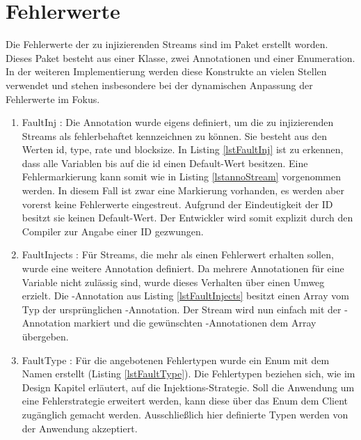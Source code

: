 \section{Fehlerwerte}
Die Fehlerwerte der zu injizierenden Streams sind im Paket  erstellt worden. Dieses Paket besteht aus einer Klasse, zwei Annotationen und einer Enumeration. In der weiteren Implementierung werden diese Konstrukte an vielen Stellen verwendet und stehen insbesondere bei der dynamischen Anpassung der Fehlerwerte im Fokus.

\begin{enumerate}
	\item FaultInj : Die Annotation  wurde eigens definiert, um die zu injizierenden Streams als fehlerbehaftet kennzeichnen zu können. Sie besteht aus den Werten id, type, rate und blocksize. In Listing \ref{lstFaultInj} ist zu erkennen, dass alle Variablen bis auf die id einen Default-Wert besitzen. Eine Fehlermarkierung kann somit wie in Listing \ref{lstannoStream} vorgenommen werden. In diesem Fall ist zwar eine Markierung vorhanden, es werden aber vorerst keine Fehlerwerte eingestreut. Aufgrund der Eindeutigkeit der ID besitzt sie keinen Default-Wert. Der Entwickler wird somit explizit durch den Compiler zur Angabe einer ID gezwungen. \\
	  
	
	
		  
	  
	  
	
	\item FaultInjects : F\"ur Streams, die mehr als einen Fehlerwert erhalten sollen, wurde eine weitere Annotation definiert. Da mehrere Annotationen für eine Variable nicht zulässig sind, wurde dieses Verhalten über einen Umweg erzielt. Die -Annotation aus Listing \ref{lstFaultInjects} besitzt einen Array vom Typ der urspr\"unglichen -Annotation. Der Stream wird nun einfach mit der -Annotation markiert und die gewünschten -Annotationen dem Array übergeben.\\
	
	
		
	\item FaultType : F\"ur die angebotenen Fehlertypen wurde ein Enum mit dem Namen  erstellt (Listing \ref{lstFaultType}). Die Fehlertypen beziehen sich, wie im Design Kapitel erl\"autert, auf die Injektions-Strategie. Soll die Anwendung um eine Fehlerstrategie erweitert werden, kann diese \"uber das Enum  dem Client zug\"anglich gemacht werden. Ausschlie\ss lich hier definierte Typen werden von der Anwendung akzeptiert.\\
	

\end{enumerate}
